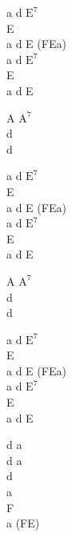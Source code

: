 \begin{chord}
    a d $\mathrm{E^{7}}$\\
    E\\
    a d E (FEa)\\
    a d $\mathrm{E^{7}}$\\
    E\\
    a d E

    A $\mathrm{A^{7}}$\\
    d\\
    d

    a d $\mathrm{E^{7}}$\\
    E\\
    a d E (FEa)\\
    a d $\mathrm{E^{7}}$\\
    E\\
    a d E

    A $\mathrm{A^{7}}$\\
    d\\
    d

    a d $\mathrm{E^{7}}$\\
    E\\
    a d E (FEa)\\
    a d $\mathrm{E^{7}}$\\
    E\\
    a d E

    d a\\
    d a\\
    d\\
    a\\
    F\\
    a (FE)
\end{chord}
